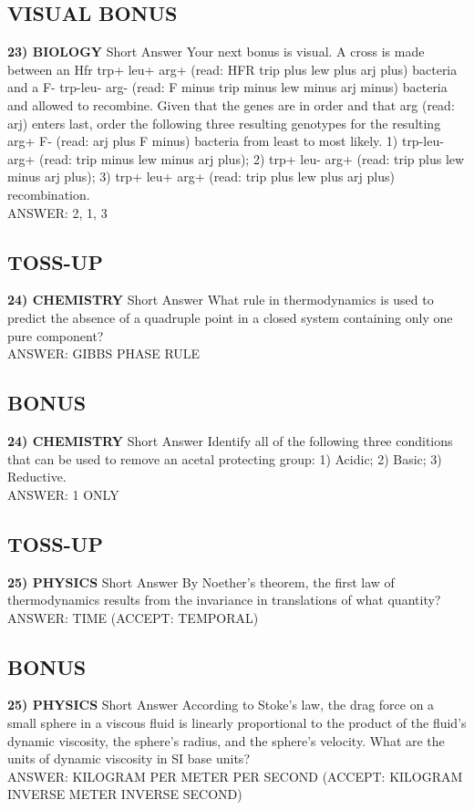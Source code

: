 \documentclass{article}
\begin{document}
\subsection*{VISUAL BONUS}
\textbf{23) BIOLOGY} Short Answer Your next bonus is visual. A cross is made between an Hfr trp+ leu+ arg+ (read: HFR trip plus lew plus arj plus) bacteria and a F- trp-leu- arg- (read: F minus trip minus lew minus arj minus) bacteria and allowed to recombine. Given that the genes are in order and that arg (read: arj) enters last, order the following three resulting genotypes for the resulting arg+ F- (read: arj plus F minus) bacteria from least to most likely. 1) trp-leu- arg+ (read: trip minus lew minus arj plus); 2) trp+ leu- arg+ (read: trip plus lew minus arj plus); 3) trp+ leu+ arg+ (read: trip plus lew plus arj plus) recombination.
\\ANSWER: 2, 1, 3

\subsection*{TOSS-UP}
\textbf{24) CHEMISTRY} Short Answer What rule in thermodynamics is used to predict the absence of a quadruple point in a closed system containing only one pure component?
\\ANSWER: GIBBS PHASE RULE

\subsection*{BONUS}
\textbf{24) CHEMISTRY} Short Answer Identify all of the following three conditions that can be used to remove an acetal protecting group: 1) Acidic; 2) Basic; 3) Reductive.
\\ANSWER: 1 ONLY

\subsection*{TOSS-UP}
\textbf{25) PHYSICS} Short Answer By Noether's theorem, the first law of thermodynamics results from the invariance in translations of what quantity?
\\ANSWER: TIME (ACCEPT: TEMPORAL)

\subsection*{BONUS}
\textbf{25) PHYSICS} Short Answer According to Stoke's law, the drag force on a small sphere in a viscous fluid is linearly proportional to the product of the fluid's dynamic viscosity, the sphere's radius, and the sphere's velocity. What are the units of dynamic viscosity in SI base units?
\\ANSWER: KILOGRAM PER METER PER SECOND (ACCEPT: KILOGRAM INVERSE METER INVERSE SECOND)
\end{document}
